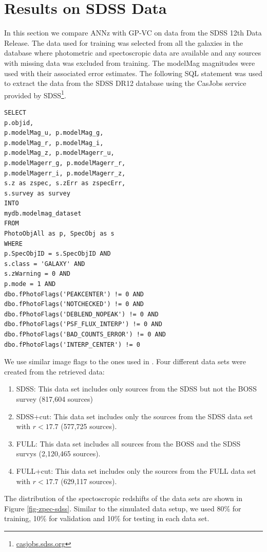 \documentclass[useAMS,usenatbib,fleqn]{mn2e}
\begin{document}
\section{Results on SDSS Data}
\label{sec-experiments-sdss}

In this section we compare {\sc ANNz} with GP-VC on data from the SDSS 12th Data Release. The data used for training was selected from all the galaxies in the database where photometric and spectoscropic data are available and any sources with missing data was excluded from training. The {\selectfont modelMag} magnitudes were used with their associated error estimates. The following SQL statement was used to extract the data from the SDSS DR12 database using the CasJobs service provided by SDSS\footnote{\url{casjobs.sdss.org}}.

\begin{verbatim}
SELECT
p.objid,
p.modelMag_u, p.modelMag_g,
p.modelMag_r, p.modelMag_i,
p.modelMag_z, p.modelMagerr_u,
p.modelMagerr_g, p.modelMagerr_r,
p.modelMagerr_i, p.modelMagerr_z,
s.z as zspec, s.zErr as zspecErr,
s.survey as survey
INTO
mydb.modelmag_dataset
FROM
PhotoObjAll as p, SpecObj as s
WHERE
p.SpecObjID = s.SpecObjID AND
s.class = 'GALAXY' AND 
s.zWarning = 0 AND
p.mode = 1 AND
dbo.fPhotoFlags('PEAKCENTER') != 0 AND
dbo.fPhotoFlags('NOTCHECKED') != 0 AND
dbo.fPhotoFlags('DEBLEND_NOPEAK') != 0 AND
dbo.fPhotoFlags('PSF_FLUX_INTERP') != 0 AND
dbo.fPhotoFlags('BAD_COUNTS_ERROR') != 0 AND
dbo.fPhotoFlags('INTERP_CENTER') != 0
\end{verbatim}

We use similar image flags to the ones used in \citet{brescia2014catalogue}. Four different data sets were created from the retrieved data:
\begin{enumerate}
  \item SDSS: This data set includes only sources from the SDSS but not the BOSS survey (817,604 sources) 
  \item SDSS+cut: This data set includes only the sources from the SDSS data set with $r<17.7$ (577,725 sources).
  \item FULL: This data set includes all sources from the BOSS and the SDSS survys (2,120,465 sources). 
  \item FULL+cut: This data set includes only the sources from the FULL data set with $r<17.7$ (629,117 sources). 
\end{enumerate}


The distribution of the spectoscropic redshifts of the data sets are shown in Figure \ref{fig-zpec-sdss}. Similar to the simulated data setup, we used 80\% for training, 10\% for validation and 10\% for testing in each data set.
\end{document}
